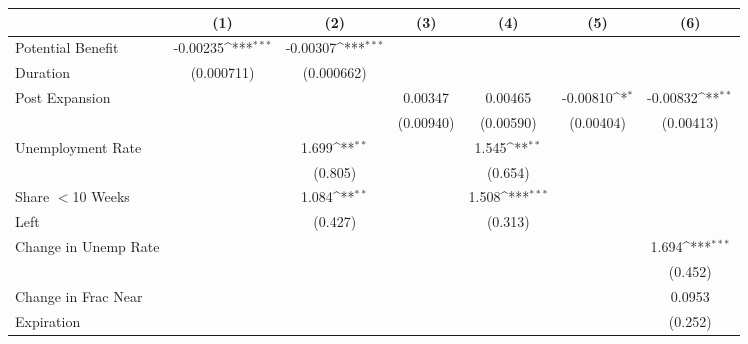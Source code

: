 {
\def\sym#1{\ifmmode^{#1}\else\(^{#1}\)\fi}
\begin{tabular}{l*{6}{c}}
\hline\hline
                    &\multicolumn{1}{c}{(1)}         &\multicolumn{1}{c}{(2)}         &\multicolumn{1}{c}{(3)}         &\multicolumn{1}{c}{(4)}         &\multicolumn{1}{c}{(5)}         &\multicolumn{1}{c}{(6)}         \\
\hline
Potential Benefit   &    -0.00235\sym{***}&    -0.00307\sym{***}&                     &                     &                     &                     \\
Duration            &  (0.000711)         &  (0.000662)         &                     &                     &                     &                     \\
[1em]
Post Expansion      &                     &                     &     0.00347         &     0.00465         &    -0.00810\sym{*}  &    -0.00832\sym{**} \\
                    &                     &                     &   (0.00940)         &   (0.00590)         &   (0.00404)         &   (0.00413)         \\
[1em]
Unemployment Rate   &                     &       1.699\sym{**} &                     &       1.545\sym{**} &                     &                     \\
                    &                     &     (0.805)         &                     &     (0.654)         &                     &                     \\
[1em]
Share $<$10 Weeks   &                     &       1.084\sym{**} &                     &       1.508\sym{***}&                     &                     \\
Left                &                     &     (0.427)         &                     &     (0.313)         &                     &                     \\
[1em]
Change in Unemp Rate&                     &                     &                     &                     &                     &       1.694\sym{***}\\
                    &                     &                     &                     &                     &                     &     (0.452)         \\
[1em]
Change in Frac Near &                     &                     &                     &                     &                     &      0.0953         \\
Expiration          &                     &                     &                     &                     &                     &     (0.252)         \\

\end{tabular}}
